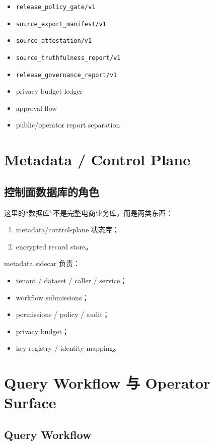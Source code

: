 \documentclass[UTF8,a4paper,12pt,oneside]{ctexrep}
\begin{document}
\begin{itemize}
  \item \texttt{release\_policy\_gate/v1}
  \item \texttt{source\_export\_manifest/v1}
  \item \texttt{source\_attestation/v1}
  \item \texttt{source\_truthfulness\_report/v1}
  \item \texttt{release\_governance\_report/v1}
  \item privacy budget ledger
  \item approval flow
  \item public/operator report separation
\end{itemize}

\section{Metadata / Control Plane}

\subsection{控制面数据库的角色}

这里的“数据库”不是完整电商业务库，而是两类东西：

\begin{enumerate}
  \item metadata/control-plane 状态库；
  \item encrypted record store。
\end{enumerate}

metadata sidecar 负责：

\begin{itemize}
  \item tenant / dataset / caller / service；
  \item workflow submissions；
  \item permissions / policy / audit；
  \item privacy budget；
  \item key registry / identity mapping。
\end{itemize}

\section{Query Workflow 与 Operator Surface}

\subsection{Query Workflow}
\end{document}
